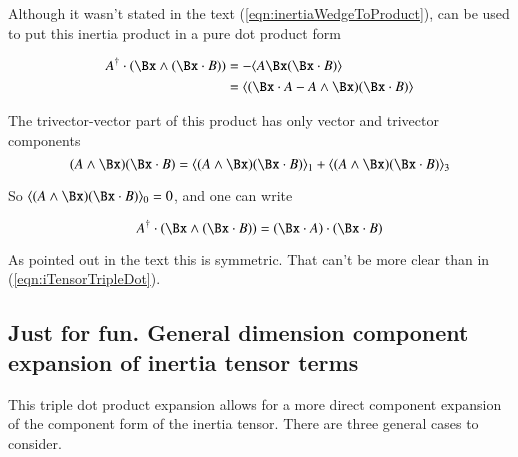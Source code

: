 \documentclass{article}      %
\begin{document}
Although it wasn't stated in the text (\ref{eqn:inertiaWedgeToProduct}), can
be used to put this inertia product in a pure dot product form

\begin{align*}
A^\dagger \cdot (\Bx \wedge (\Bx \cdot B) )
&= -\langle {A \Bx (\Bx \cdot B)} \rangle \\
&= \langle (\Bx \cdot A - A \wedge \Bx)(\Bx \cdot B) \rangle \\
\end{align*}

The trivector-vector part of this product has only vector and trivector components
\[
(A \wedge \Bx)(\Bx \cdot B) = \langle{ (A \wedge \Bx)(\Bx \cdot B)}\rangle_1 + \langle{(A \wedge \Bx)(\Bx \cdot B)}\rangle_3
\]

So $\langle{(A \wedge \Bx)(\Bx \cdot B)}\rangle_0 = 0$, and one can write

\begin{equation}
A^\dagger \cdot (\Bx \wedge (\Bx \cdot B) ) = (\Bx \cdot A) \cdot (\Bx \cdot B)
\end{equation}\label{eqn:iTensorTripleDot}

As pointed out in the text this is symmetric.  That can't be more clear than in (\ref{eqn:iTensorTripleDot}).

\subsection{ Just for fun.  General dimension component expansion of inertia tensor terms }

This triple dot product expansion allows for a more direct component expansion of the component form of the inertia tensor.
There are three general cases to consider.
\end{document}
